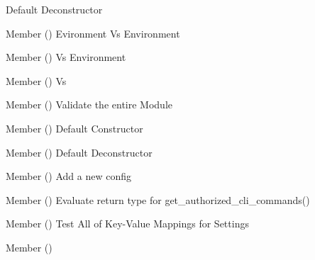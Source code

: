\begin{DoxyRefList}
%
Default Deconstructor  
\item[Member \doxylink{class_test_combat_a19bc46109de13a441fc23955d5a6963b}{Test\+Combat\+::EVECombat} ()]\label{todo__todo000239}%
%
Evironment Vs Environment   
\item[Member \doxylink{class_test_combat_a35d174e2341becc26a1f54b8c79197db}{Test\+Combat\+::PVECombat} ()]\label{todo__todo000240}%
%
 Vs Environment   
\item[Member \doxylink{class_test_combat_ab9c28a804fb6a294d276bf06c814a0de}{Test\+Combat\+::PVPCombat} ()]\label{todo__todo000241}%
%
 Vs    
\item[Member \doxylink{class_test_combat_a5374dd1ec208d70d1c6b357d114a77f4}{Test\+Combat\+::test\+\_\+all} ()]\label{todo__todo000238}%
%
Validate the entire  Module  
\item[Member \doxylink{class_test_combat_aa6a2cb666d674c1cc19644a77b06fc18}{Test\+Combat\+::Test\+Combat} ()]\label{todo__todo000237}%
%
Default Constructor  
\item[Member \doxylink{class_test_combat_a3f857bd167d74e10cffce0d89630b78d}{Test\+Combat\+::\texorpdfstring{$\sim$}{\string~}\+Test\+Combat} ()]\label{todo__todo000242}%
%
Default Deconstructor  
\item[Member \doxylink{class_test_config_a2179479694e8571ddf8664ab29af575d}{Test\+Config\+::add\+Config} ()]\label{todo__todo000246}%
%
Add a new config  
\item[Member \doxylink{class_test_config_ae419bbde8924939dc79066024203cb15}{Test\+Config\+::list\+Of\+Commands} ()]\label{todo__todo000248}%
%
Evaluate return type for get\+\_\+authorized\+\_\+cli\+\_\+commands()  
\item[Member \doxylink{class_test_config_a44301e3edfcdb49b09fa927d3b0784fb}{Test\+Config\+::mapping} ()]\label{todo__todo000245}%
%
Test All of Key-\/\+Value Mappings for Settings  
\item[Member \doxylink{class_test_config_ad5adbab363071f2c467cb38bf3d52b66}{Test\+Config\+::rem\+Config} ()]\label{todo__todo000247}%

\end{DoxyRefList}
